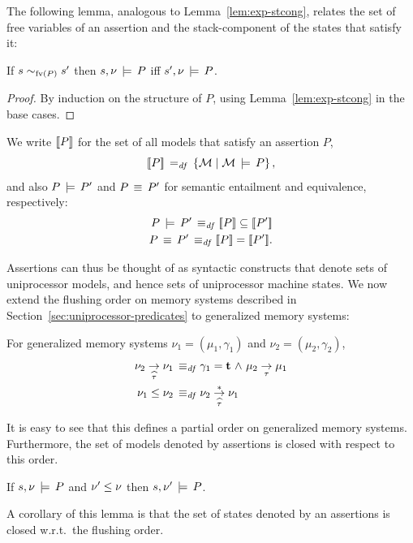 \documentclass[11pt]{report}
\begin{document}
The following lemma, analogous to Lemma~\ref{lem:exp-stcong}, relates the set of free variables of an assertion and the stack-component of the states that satisfy it:
\begin{lemma}
\label{lem:assertion-stcong}
    If $s \sim_{\mathrm{fv}(P)} s'$ then $s,\nu \,\models\, P$ iff $s',\nu \,\models\, P$. 
\end{lemma}
\begin{proof}
By induction on the structure of $P$, using Lemma~\ref{lem:exp-stcong} in the base cases. 
\end{proof}

We write $[\![P]\!]$ for the set of all models that satisfy an assertion $P$,\[ [\![P]\!] \operatorname{\;=_{\mathit{df}}\;} \left\lbrace \mathcal{M} \mid \mathcal{M} \,\models\, P \right\rbrace,\] and also $P \,\models\, P'$ and $P \,\equiv\, P'$ for semantic entailment and equivalence, respectively: \begin{align*}
    P \sentails P' \iffdef \pred{P} \subseteq \pred{P'} \\
    P \sequiv P' \iffdef \pred{P} = \pred{P'}.
\end{align*} 

Assertions can thus be thought of as syntactic constructs that denote sets of uniprocessor models, and hence sets of uniprocessor machine states. We now extend the flushing order on memory systems described in Section~\ref{sec:uniprocessor-predicates} to generalized memory systems: 
\begin{definition}
  For generalized memory systems $\nu_1 = (\mu_1,\gamma_1)$ and $\nu_2 = (\mu_2,\gamma_2)$, \begin{align*}
  \nu_2 \underset{\widehat{\tau}}{\rightarrow} \nu_1 \operatorname{\;\equiv_{\mathit{df}}\;} & \gamma_1 = \mathbf{t} \operatorname{\,\wedge\,} \mu_2 \underset{\tau}{\rightarrow} \mu_1 \\ 
  \nu_1 \leq \nu_2 \operatorname{\;\equiv_{\mathit{df}}\;} & \nu_2 \overset{\ast}{\underset{\widehat{\tau}}{\rightarrow}} \nu_1
  \end{align*} 
\end{definition} It is easy to see that this defines a partial order on generalized memory systems. Furthermore, the set of models denoted by assertions is closed with respect to this order. 

\begin{lemma}
    \label{lem:assertions-denote-predicates}
    If $s,\nu \,\models\, P$ and $\nu' \leq \nu$ then $s,\nu' \,\models\, P$. 
\end{lemma}

A corollary of this lemma is that the set of states denoted by an assertions is closed w.r.t.\ the flushing order.  
\end{document}
